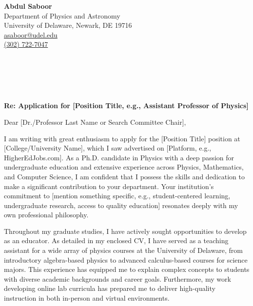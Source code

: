 \documentclass[letter,11pt]{article}
\begin{document}
\noindent
\textbf{Abdul Saboor} \\
Department of Physics and Astronomy \\
University of Delaware, Newark, DE 19716 \\
\href{mailto:asaboor@udel.edu}{asaboor@udel.edu} \\
\href{tel:+13027227047}{(302) 722-7047}

\vspace{1cm}

\noindent
[Date]

\vspace{5mm}

 \\
[Chair's Title, e.g., Chair of the Search Committee] \\
[Department Name, e.g., Department of Physical Sciences] \\
[College/University Name] \\
[College/University Address]

\vspace{5mm}

\noindent
\textbf{Re: Application for [Position Title, e.g., Assistant Professor of Physics]}

\vspace{5mm}

\noindent
Dear [Dr./Professor Last Name or Search Committee Chair],

I am writing with great enthusiasm to apply for the [Position Title] position at [College/University Name], which I saw advertised on [Platform, e.g., HigherEdJobs.com]. As a Ph.D. candidate in Physics with a deep passion for undergraduate education and extensive experience across Physics, Mathematics, and Computer Science, I am confident that I possess the skills and dedication to make a significant contribution to your department. Your institution's commitment to [mention something specific, e.g., student-centered learning, undergraduate research, access to quality education] resonates deeply with my own professional philosophy.

Throughout my graduate studies, I have actively sought opportunities to develop as an educator. As detailed in my enclosed CV, I have served as a teaching assistant for a wide array of physics courses at the University of Delaware, from introductory algebra-based physics to advanced calculus-based courses for science majors. This experience has equipped me to explain complex concepts to students with diverse academic backgrounds and career goals. Furthermore, my work developing online lab curricula has prepared me to deliver high-quality instruction in both in-person and virtual environments.
\end{document}
